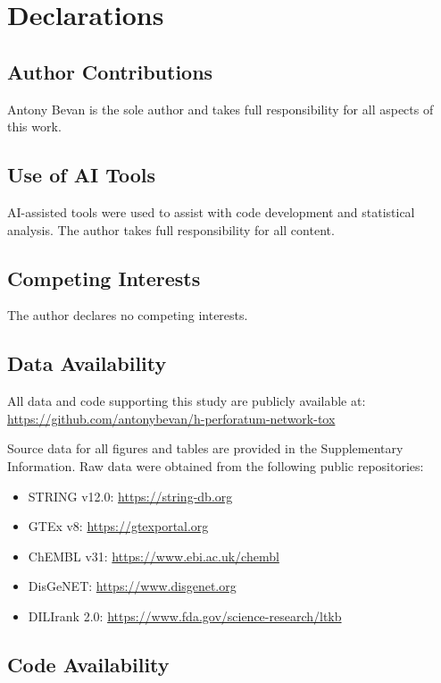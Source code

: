 \clearpage
\section*{Declarations}

\subsection*{Author Contributions}

Antony Bevan is the sole author and takes full responsibility for all aspects of this work.

\subsection*{Use of AI Tools}

AI-assisted tools were used to assist with code development and statistical analysis. The author takes full responsibility for all content.

\subsection*{Competing Interests}

The author declares no competing interests.

\subsection*{Data Availability}

All data and code supporting this study are publicly available at:
\url{https://github.com/antonybevan/h-perforatum-network-tox}

Source data for all figures and tables are provided in the Supplementary Information.
Raw data were obtained from the following public repositories:
\begin{itemize}
    \item STRING v12.0: \url{https://string-db.org}
    \item GTEx v8: \url{https://gtexportal.org}
    \item ChEMBL v31: \url{https://www.ebi.ac.uk/chembl}
    \item DisGeNET: \url{https://www.disgenet.org}
    \item DILIrank 2.0: \url{https://www.fda.gov/science-research/ltkb}
\end{itemize}

\subsection*{Code Availability}

